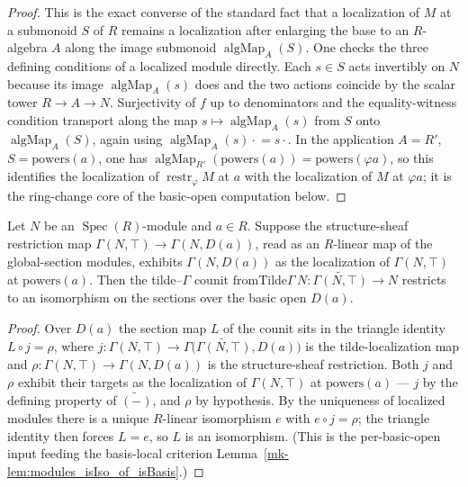 \begin{proof}
  \leanok


This is the exact converse of the standard fact that a localization of \(M\) at a
  submonoid \(S\) of \(R\) remains a localization after enlarging the base to an
  \(R\)-algebra \(A\) along the image submonoid \(\operatorname{algMap}_A(S)\). One
  checks the three defining conditions of a localized module directly. Each
  \(s \in S\) acts invertibly on \(N\) because its image
  \(\operatorname{algMap}_A(s)\) does and the two actions coincide by the scalar
  tower \(R \to A \to N\). Surjectivity of \(f\) up to denominators and the
  equality-witness condition transport along the map
  \(s \mapsto \operatorname{algMap}_A(s)\) from \(S\) onto
  \(\operatorname{algMap}_A(S)\), again using
  \(\operatorname{algMap}_A(s)\cdot{} = s\cdot{}\). In the application
  \(A = R'\), \(S = \mathrm{powers}(a)\), one has
  \(\operatorname{algMap}_{R'}(\mathrm{powers}(a)) = \mathrm{powers}(\varphi a)\), so
  this identifies the localization of \(\operatorname{restr}_\varphi M\) at \(a\)
  with the localization of \(M\) at \(\varphi a\); it is the ring-change core of the
  basic-open computation below.
\end{proof}

\begin{lemma}\label{mk-lem:fromTildeGamma_app_isIso_of_localized}
  \leanok

  Let \(N\) be an \(\operatorname{Spec}(R)\)-module and \(a \in R\). Suppose the
  structure-sheaf restriction map \(\Gamma(N, \top) \to \Gamma(N, D(a))\), read as
  an \(R\)-linear map of the global-section modules, exhibits \(\Gamma(N, D(a))\) as
  the localization of \(\Gamma(N, \top)\) at \(\mathrm{powers}(a)\). Then the
  tilde--\(\Gamma\) counit
  \(\mathrm{fromTilde}\Gamma\,N : \widetilde{\Gamma(N,\top)} \to N\) restricts to an
  isomorphism on the sections over the basic open \(D(a)\).
\end{lemma}

\begin{proof}
  \leanok


Over \(D(a)\) the section map \(L\) of the counit sits in the triangle identity
  \(L \circ j = \rho\), where
  \(j : \Gamma(N,\top) \to \Gamma\bigl(\widetilde{\Gamma(N,\top)}, D(a)\bigr)\) is
  the tilde-localization map and \(\rho : \Gamma(N,\top) \to \Gamma(N, D(a))\) is
  the structure-sheaf restriction. Both \(j\) and \(\rho\) exhibit their targets as
  the localization of \(\Gamma(N,\top)\) at \(\mathrm{powers}(a)\) — \(j\) by the
  defining property of \(\widetilde{(-)}\), and \(\rho\) by hypothesis. By the
  uniqueness of localized modules there is a unique \(R\)-linear isomorphism \(e\)
  with \(e \circ j = \rho\); the triangle identity then forces \(L = e\), so \(L\) is
  an isomorphism. (This is the per-basic-open input feeding the basis-local
  criterion Lemma~\ref{mk-lem:modules_isIso_of_isBasis}.)
\end{proof}

